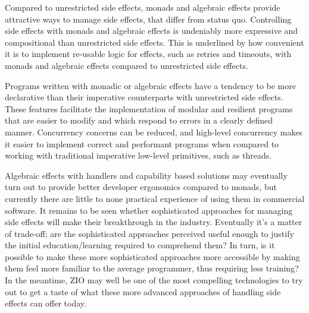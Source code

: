 Compared to unrestricted side effects, monads and algebraic effects provide attractive ways to manage side effects, that differ from status quo. Controlling side effects with monads and algebraic effects is undeniably more expressive and compositional than unrestricted side effects. This is underlined by how convenient it is to implement re-usable logic for effects, such as retries and timeouts, with monads and algebraic effects compared to unrestricted side effects.

Programs written with monadic or algebraic effects have a tendency to be more declarative than their imperative counterparts with unrestricted side effects. These features facilitate the implementation of modular and resilient programs that are easier to modify and  which respond to errors in a clearly defined manner. Concurrency concerns can be reduced, and high-level concurrency makes it easier to implement correct and performant programs when compared to working with traditional imperative low-level primitives, such as threads.


Algebraic effects with handlers and capability based solutions may eventually turn out to provide better developer ergonomics compared to monads, but currently there are little to none practical experience of using them in commercial software. It remains to be seen whether sophisticated approaches for managing side effects will make their breakthrough in the industry. Eventually it's a matter of trade-off; are the sophisticated approaches perceived useful enough to justify the initial education/learning required to comprehend them? In turn, is it possible to make these more sophisticated approaches more accessible by making them feel more familiar to the average programmer, thus requiring less training? In the meantime, ZIO may well be one of the most compelling technologies to try out to get a taste of what these more advanced approaches of handling side effects can offer today.




